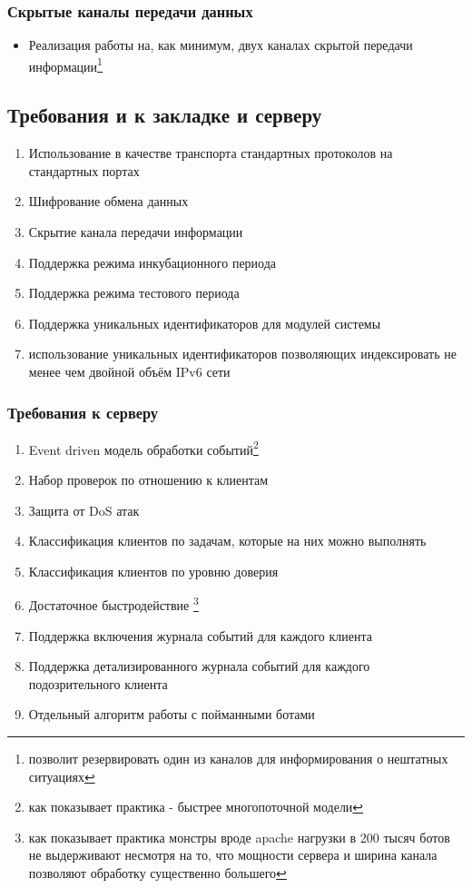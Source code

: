 \subsubsection{Скрытые каналы передачи данных}

\begin{itemize}
\item{ Реализация работы на, как минимум, двух каналах скрытой передачи
информации\footnote{позволит резервировать один из каналов для
информирования о нештатных ситуациях}
}
\end{itemize}


\subsection{Требования и к закладке и серверу}

\begin{enumerate}
\item{Использование в качестве транспорта стандартных протоколов на стандартных портах}
\item{Шифрование обмена данных}
\item{Скрытие канала передачи информации}
\item{Поддержка режима инкубационного периода}
\item{Поддержка режима тестового периода}
\item{Поддержка уникальных идентификаторов для модулей системы}
\item{использование уникальных идентификаторов позволяющих индексировать не
менее чем двойной объём IPv6 сети}
\end{enumerate}

\subsubsection{Требования к серверу}

\begin{enumerate}
\item{Event driven модель обработки событий\footnote{как показывает практика - быстрее многопоточной модели}}
\item{Набор проверок по отношению к клиентам}
\item{Защита от DoS атак}
\item{Классификация клиентов по задачам, которые на них можно выполнять}
\item{Классификация клиентов по уровню доверия}
\item{Достаточное быстродействие
\footnote{как показывает практика монстры вроде apache нагрузки в 200 тысяч ботов
не выдерживают несмотря на то, что мощности сервера и ширина канала позволяют обработку существенно большего}
}
\item{Поддержка включения журнала событий для каждого клиента}
\item{Поддержка детализированного журнала событий для каждого подозрительного клиента}
\item{Отдельный алгоритм работы с пойманными ботами}
\end{enumerate}

